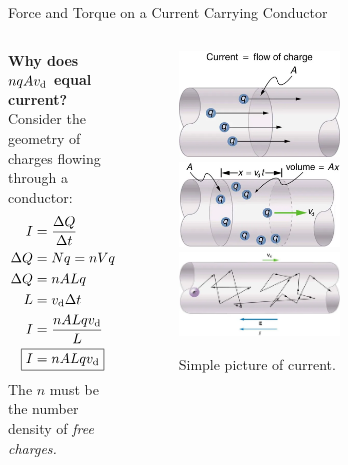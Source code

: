 \documentclass{beamer}
\begin{document}
\begin{frame}{Force and Torque on a Current Carrying Conductor}
\begin{columns}[T]
\begin{column}{0.4\textwidth}
\footnotesize
\textbf{\alert{Why does $nqAv_{\rm d}$ equal current?}} Consider the geometry of charges flowing through a conductor:
\begin{align}
I &= \frac{\Delta Q}{\Delta t} \\
\Delta Q &= N q = n V q \\
\Delta Q &= n A L q \\
L &= v_{\rm d} \Delta t \\
I &= \frac{n A L q v_{\rm d}}{L} \\
\Aboxed{I &= n A L q v_{\rm d}}
\end{align}
The $n$ must be the number density of \textit{free charges.}
\end{column}
\begin{column}{0.6\textwidth}
\begin{figure}
\centering
\includegraphics[width=0.55\textwidth]{figures/current_1.png}
\includegraphics[width=0.55\textwidth]{figures/current_0.png}
\includegraphics[width=0.55\textwidth]{figures/current_2.png}
\caption{\label{fig:current} Simple picture of current.}
\end{figure}
\end{column}
\end{columns}
\end{frame}
\end{document}
